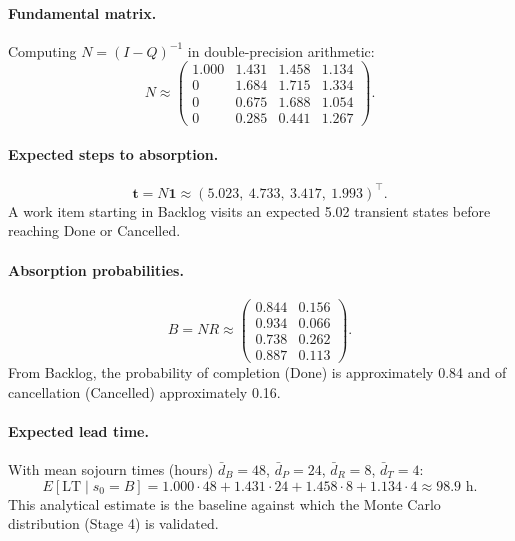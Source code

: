 \paragraph{Fundamental matrix.} Computing $N = (I - Q)^{-1}$ in
double-precision arithmetic:
\begin{equation}
N \approx \begin{pmatrix}
1.000 & 1.431 & 1.458 & 1.134 \\
0     & 1.684 & 1.715 & 1.334 \\
0     & 0.675 & 1.688 & 1.054 \\
0     & 0.285 & 0.441 & 1.267
\end{pmatrix}.
\end{equation}

\paragraph{Expected steps to absorption.}
\begin{equation}
\mathbf{t} = N \mathbf{1} \approx (5.023,\ 4.733,\ 3.417,\ 1.993)^\top.
\end{equation}
A work item starting in Backlog visits an expected 5.02 transient states
before reaching Done or Cancelled.

\paragraph{Absorption probabilities.}
\begin{equation}
B = N R \approx \begin{pmatrix}
0.844 & 0.156 \\
0.934 & 0.066 \\
0.738 & 0.262 \\
0.887 & 0.113
\end{pmatrix}.
\end{equation}
From Backlog, the probability of completion (Done) is approximately 0.84
and of cancellation (Cancelled) approximately 0.16.

\paragraph{Expected lead time.} With mean sojourn times (hours)
$\bar{d}_B = 48$, $\bar{d}_P = 24$, $\bar{d}_R = 8$, $\bar{d}_T = 4$:
\begin{equation}
E[\mathrm{LT} \mid s_0 = B]
= 1.000 \cdot 48 + 1.431 \cdot 24 + 1.458 \cdot 8 + 1.134 \cdot 4
\approx 98.9 \text{ h}.
\end{equation}
This analytical estimate is the baseline against which the Monte Carlo
distribution (Stage 4) is validated.


